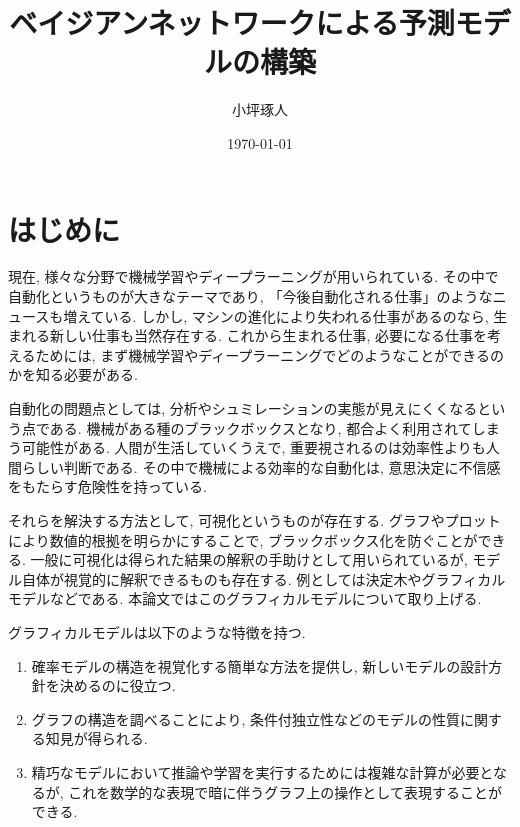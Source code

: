 \documentclass[a4paper]{jarticle}
\title{ベイジアンネットワークによる予測モデルの構築}   %
\author{小坪琢人}   %
\date{\today}   %
\begin{document}
\maketitle   %
\setlength{\baselineskip}{20pt}   %
\tableofcontents   %
\listoffigures   %
\listoftables   %
\clearpage   %


\section{はじめに}

現在, 様々な分野で機械学習やディープラーニングが用いられている. その中で自動化というものが大きなテーマであり, 「今後自動化される仕事」のようなニュースも増えている. しかし, マシンの進化により失われる仕事があるのなら, 生まれる新しい仕事も当然存在する. これから生まれる仕事, 必要になる仕事を考えるためには, まず機械学習やディープラーニングでどのようなことができるのかを知る必要がある. 

自動化の問題点としては, 分析やシュミレーションの実態が見えにくくなるという点である. 機械がある種のブラックボックスとなり, 都合よく利用されてしまう可能性がある. 人間が生活していくうえで, 重要視されるのは効率性よりも人間らしい判断である. その中で機械による効率的な自動化は, 意思決定に不信感をもたらす危険性を持っている.

それらを解決する方法として, 可視化というものが存在する. グラフやプロットにより数値的根拠を明らかにすることで, ブラックボックス化を防ぐことができる. 一般に可視化は得られた結果の解釈の手助けとして用いられているが, モデル自体が視覚的に解釈できるものも存在する. 例としては決定木やグラフィカルモデルなどである. 本論文ではこのグラフィカルモデルについて取り上げる. 


グラフィカルモデルは以下のような特徴を持つ.~\cite{Bishop1}~\cite{Bishop2}

\begin{enumerate}

\item 確率モデルの構造を視覚化する簡単な方法を提供し, 新しいモデルの設計方針を決めるのに役立つ.

\item グラフの構造を調べることにより, 条件付独立性などのモデルの性質に関する知見が得られる.

\item 精巧なモデルにおいて推論や学習を実行するためには複雑な計算が必要となるが, これを数学的な表現で暗に伴うグラフ上の操作として表現することができる.

\end{enumerate}
\end{document}
